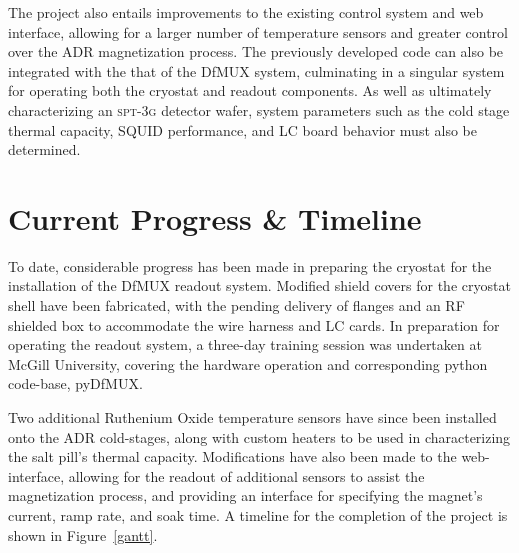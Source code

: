 \documentclass[preprint]{aastex}
\begin{document}
The project also entails improvements to the existing control system and web interface, allowing for a larger number of temperature sensors and greater control over the ADR magnetization process.  The previously developed code can also be integrated with the that of the DfMUX system, culminating in a singular system for operating both the cryostat and readout components.  As well as ultimately characterizing an \textsc{spt-3g} detector wafer, system parameters such as the cold stage thermal capacity, SQUID performance, and LC board behavior must also be determined.



\section{Current Progress \& Timeline}

To date, considerable progress has been made in preparing the cryostat for the installation of the DfMUX readout system.  Modified shield covers for the cryostat shell have been fabricated, with the pending delivery of flanges and an RF shielded box to accommodate the wire harness and LC cards.  In preparation for operating the readout system, a three-day training session was undertaken at McGill University, covering the hardware operation and corresponding python code-base, pyDfMUX.

Two additional Ruthenium Oxide temperature sensors have since been installed onto the ADR cold-stages, along with custom heaters to be used in characterizing the salt pill's thermal capacity.  Modifications have also been made to the web-interface, allowing for the readout of additional sensors to assist the magnetization process, and providing an interface for specifying the magnet's current, ramp rate, and soak time.  A timeline for the completion of the project is shown in Figure~\ref{gantt}.




\end{document}
